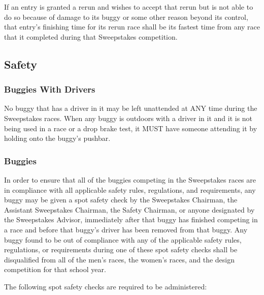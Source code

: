 	If an entry is granted a rerun and wishes to accept that rerun but is not able
	to do so because of damage to its buggy or some other reason beyond its
	control, that entry's finishing time for its rerun race shall be its fastest
	time from any race that it completed during that Sweepstakes competition.

\subsection{Safety}

\subsubsection{Buggies With Drivers}

	No buggy that has a driver in it may be left unattended at ANY time during the
	Sweepstakes races. When any buggy is outdoors with a driver in it and it is not
	being used in a race or a drop brake test, it MUST have someone attending it by
	holding onto the buggy's pushbar.

\subsubsection{Buggies}

	In order to ensure that all of the buggies competing in the Sweepstakes races
	are in compliance with all applicable safety rules, regulations, and
	requirements, any buggy may be given a spot safety check by the Sweepstakes
	Chairman, the Assistant Sweepstakes Chairman, the Safety Chairman, or anyone
	designated by the Sweepstakes Advisor, immediately after that buggy has
	finished competing in a race and before that buggy's driver has been removed
	from that buggy. Any buggy found to be out of compliance with any of the
	applicable safety rules, regulations, or requirements during one of these spot
	safety checks shall be disqualified from all of the men's races, the women's
	races, and the design competition for that school year.
	\newline

	\noindent The following spot safety checks are required to be administered:

